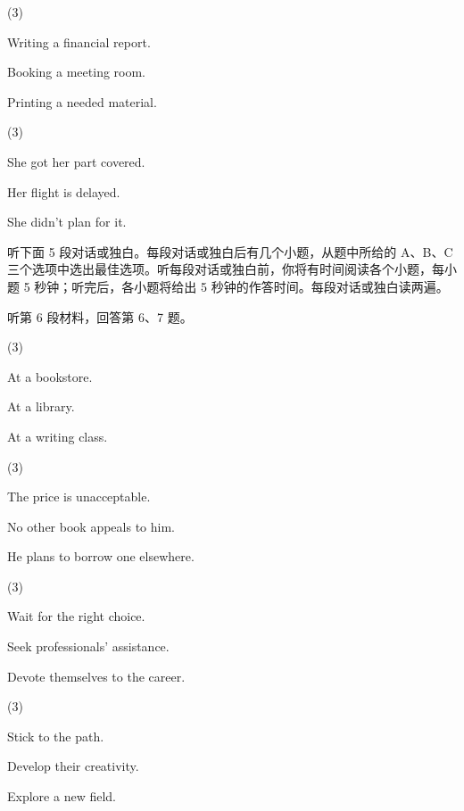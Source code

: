 \documentclass{英语试卷}
\begin{document}
\begin{choices}(3)
  \item Writing a financial report.
  \item Booking a meeting room.
  \item Printing a needed material.
\end{choices}
\begin{choices}(3)
  \item She got her part covered.
  \item Her flight is delayed.
  \item She didn't plan for it.
\end{choices}
\par 听下面 5 段对话或独白。每段对话或独白后有几个小题，从题中所给的 A、B、C 三个选项中选出最佳选项。听每段对话或独白前，你将有时间阅读各个小题，每小题 5 秒钟；听完后，各小题将给出 5 秒钟的作答时间。每段对话或独白读两遍。\par
\par 听第 6 段材料，回答第 6、7 题。\par
{}
\begin{choices}(3)
  \item At a bookstore.
  \item At a library.
  \item At a writing class.
\end{choices}
\begin{choices}(3)
  \item The price is unacceptable.
  \item No other book appeals to him.
  \item He plans to borrow one elsewhere.
\end{choices}
\begin{choices}(3)
  \item Wait for the right choice.
  \item Seek professionals' assistance.
  \item Devote themselves to the career.
\end{choices}
\begin{choices}(3)
  \item Stick to the path.
  \item Develop their creativity.
  \item Explore a new field.
\end{choices}
\end{document}
